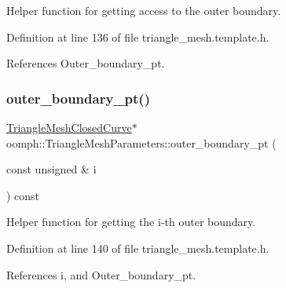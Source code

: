 Helper function for getting access to the outer boundary. 



Definition at line 136 of file triangle\+\_\+mesh.\+template.\+h.



References Outer\+\_\+boundary\+\_\+pt.

\mbox{\label{classoomph_1_1TriangleMeshParameters_a1b2f09177982f5c2f5a96d3f532d6ee7}} 
\subsubsection{\texorpdfstring{outer\+\_\+boundary\+\_\+pt()}{outer\_boundary\_pt()}\hspace{0.1cm}{\footnotesize\ttfamily [3/4]}}
{\footnotesize\ttfamily \hyperlink{classoomph_1_1TriangleMeshClosedCurve}{Triangle\+Mesh\+Closed\+Curve}$\ast$ oomph\+::\+Triangle\+Mesh\+Parameters\+::outer\+\_\+boundary\+\_\+pt (\begin{DoxyParamCaption}\item[{const unsigned \&}]{i }\end{DoxyParamCaption}) const\hspace{0.3cm}{\ttfamily [inline]}}



Helper function for getting the i-\/th outer boundary. 



Definition at line 140 of file triangle\+\_\+mesh.\+template.\+h.



References i, and Outer\+\_\+boundary\+\_\+pt.

\mbox{\label{classoomph_1_1TriangleMeshParameters_aeefafcb68aba56fcc64806359feb32aa}} 
